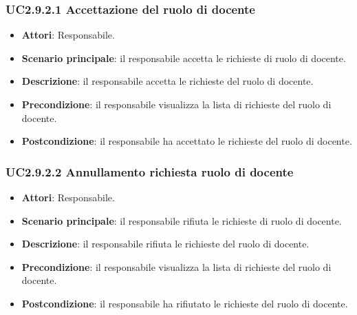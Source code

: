 \subsubsection{UC2.9.2.1 Accettazione del ruolo di docente}
\begin{itemize}
\item \textbf{Attori}: Responsabile.
\item \textbf{Scenario principale}: il responsabile accetta le richieste di ruolo di docente.
\item \textbf{Descrizione}: il responsabile accetta  le richieste del ruolo di docente.
\item \textbf{Precondizione}: il responsabile visualizza la lista di richieste del ruolo di docente.
\item \textbf{Postcondizione}: il responsabile ha accettato le richieste del ruolo di docente.
\end{itemize}
\subsubsection{UC2.9.2.2 Annullamento richiesta ruolo di docente}
\begin{itemize}
\item \textbf{Attori}: Responsabile.
\item \textbf{Scenario principale}: il responsabile rifiuta le richieste di ruolo di docente.
\item \textbf{Descrizione}: il responsabile rifiuta le richieste del ruolo di docente.
\item \textbf{Precondizione}: il responsabile visualizza la lista di richieste del ruolo di docente.
\item \textbf{Postcondizione}: il responsabile ha rifiutato le richieste del ruolo di docente.
\end{itemize}
